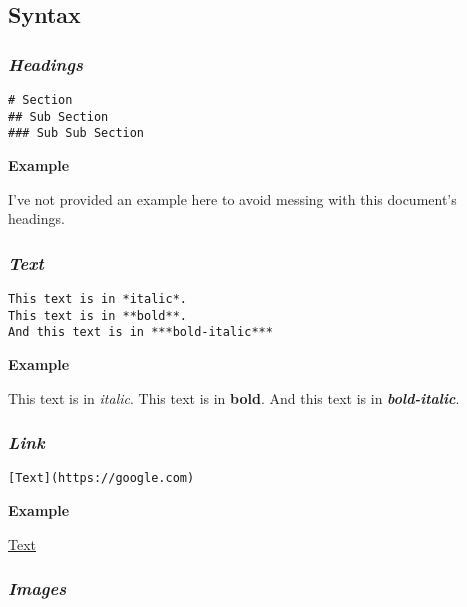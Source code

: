 \documentclass[journal,]{IEEEtran}
\begin{document}
\hypertarget{syntax}{%
\subsection{Syntax}\label{syntax}}

\hypertarget{headings}{%
\subsubsection{\texorpdfstring{\textbf{\emph{Headings}}}{Headings}}\label{headings}}

\begin{verbatim}
# Section
## Sub Section
### Sub Sub Section
\end{verbatim}

\textbf{Example}

I've not provided an example here to avoid messing with this document's
headings.

\hypertarget{text}{%
\subsubsection{\texorpdfstring{\textbf{\emph{Text}}}{Text}}\label{text}}

\begin{verbatim}
This text is in *italic*.
This text is in **bold**.
And this text is in ***bold-italic***
\end{verbatim}

\textbf{Example}

This text is in \emph{italic}. This text is in \textbf{bold}. And this
text is in \textbf{\emph{bold-italic}}.

\hypertarget{link}{%
\subsubsection{\texorpdfstring{\textbf{\emph{Link}}}{Link}}\label{link}}

\begin{verbatim}
[Text](https://google.com)
\end{verbatim}

\textbf{Example}

\href{https://google.com}{Text}

\hypertarget{images}{%
\subsubsection{\texorpdfstring{\textbf{\emph{Images}}}{Images}}\label{images}}
\end{document}
